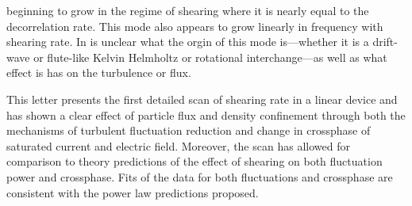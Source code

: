 \documentclass[%
 aps,
 prl,
 amsmath,amssymb,
 reprint,%
]{revtex4-1}
\begin{document}
beginning to grow in the regime of shearing where it is nearly equal to the decorrelation rate. This mode also appears to grow linearly in frequency with shearing rate. In is unclear what the orgin of this mode is---whether it is a drift-wave or flute-like Kelvin Helmholtz or rotational interchange---as well as what effect is has on the turbulence or flux. 


This letter presents the first detailed scan of shearing rate in a linear device and has shown a clear effect of particle flux and density confinement through both the mechanisms of turbulent fluctuation reduction and change in crossphase of saturated current and electric field. Moreover, the scan has allowed for comparison to theory predictions of the effect of shearing on both fluctuation power and crossphase. Fits of the data for both fluctuations and crossphase are consistent with the power law predictions proposed.

\end{document}
